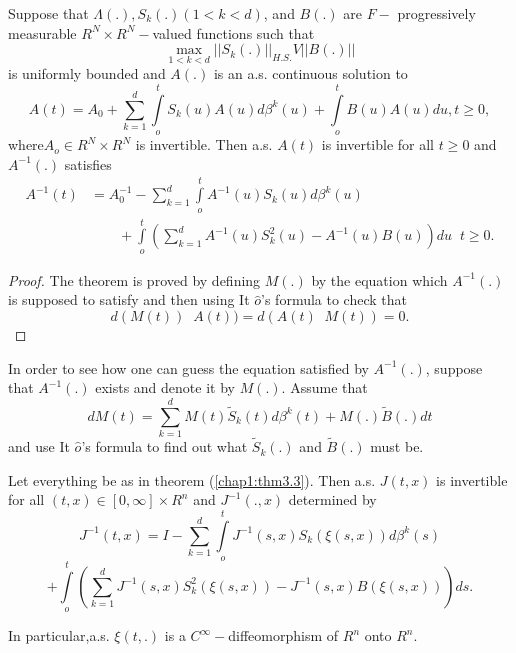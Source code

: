 \setcounter{lemma}{6}
\begin{lemma} %
Suppose that $\Lambda(.),S_k (.) (1 <k<d)$, and $B(.)$ are
\break $F-$ progressively measurable $R^N \times R^N-$valued functions such
that 
$$
\max _{1 < k<d} ||S_k (.) ||_{H.S.} V ||B(.)|| 
$$
is uniformly bounded and $A(.)$ is an a.s. continuous solution to  
$$
A(t)= A_0+ \sum^d_{k=1} \int\limits^t_o S_k (u)A (u)d \beta^k 
(u)+ \int \limits^t_o B(u)A(u)du,t \ge 0, 
$$
where\pageoriginale $A_o \in R^N \times R^N$  is invertible. Then
a.s. $A(t)$ is invertible for all $t \geq 0$ and $A^{-1}(.)$ satisfies   
 \begin{align*}
 A^{-1}(t)& = A^{-1}_0 - \sum^{d}_{k=1} \int \limits ^t_o A^{-1}(u)S_k
 (u)d \beta^k(u)\\
& \qquad + \int \limits^t_o (\sum^{d}_{k=1} A^{-1} (u)S^2_k
 (u)-A^{-1}(u)B(u))du \;\; t \geq 0. 
 \end{align*}
 \end{lemma}

 \begin{proof}
The theorem is proved by defining $M(.)$ by the equation which
$A^{-1}(.)$ is supposed to satisfy and then using It $\hat{o}$'s
formula to check that  
$$
d(M(t)) \;\;  A(t)) =d(A(t) \;\; M(t))=0.
$$
\end{proof} 


\setcounter{exercise}{7}
\begin{exercise} %
In order to see how one can guess the equation satisfied by
$A^{-1}(.)$, suppose that $A^{-1}(.)$ exists and denote it by
$M(.)$. Assume that  
$$
dM(t)= \sum^{d}_{k=1}M(t) \tilde{S}_k (t) d \beta^k (t)+ M(.)
\tilde{B}(.)dt 
$$
and use It $\hat{o}$'s formula to find out what $\tilde{S}_k(.)$ and
$\tilde{B}(.)$ must be. 
\end{exercise}


\setcounter{theorem}{8}
\begin{theorem} %
Let everything be as in theorem (\ref{chap1:thm3.3}). Then a.s. $J(t,x)$ is
invertible for all $(t,x) \in [0, \infty] \times R^n$ and
$J^{-1}(.,x)$ determined by  
\begin{equation*}
J^{-1}(t,x) = I - \sum^{d}_{k=1} \int \limits^{t}_{o} J^{-1} (s,x)S_k
(\xi (s,x))d \beta^k (s) \tag{3.10}\label{chap1:eq3.10}    
\end{equation*}
$$
+ \int \limits^t_o (\sum^{d}_{k=1}J^{-1}(s,x)S^2_k (\xi
(s,x))-J^{-1}(s,x)B(\xi (s,x)))ds. 
$$

In particular,\pageoriginale a.s. $\xi(t,.)$ is a
$C^\infty-$diffeomorphism of $R^n$ onto $R^n$.  
\end{theorem}


